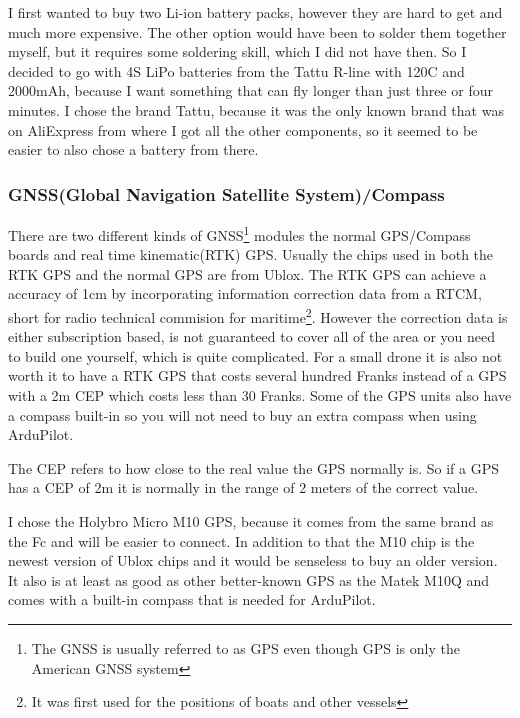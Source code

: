 \documentclass{article}
\begin{document}
	I first wanted to buy two Li-ion battery packs, however they are hard to get and much more expensive. The other option would have been to solder them together myself, but it requires some soldering skill, which I did not have then. So I decided to go with 4S LiPo batteries from the Tattu R-line with 120C and 2000mAh\cite{tattu}, because I want something that can fly longer than just three or four minutes. I chose the brand Tattu, because it was the only known brand that was on AliExpress from where I got all the other components, so it seemed to be easier to also chose a battery from there. 
	
	\subsubsection{GNSS(Global Navigation Satellite System)/Compass}
	There are two different kinds of GNSS\footnote{The GNSS is usually referred to as GPS even though GPS is only the American GNSS system} modules the normal GPS/Compass boards and real time kinematic(RTK) GPS. Usually the chips used in both the RTK GPS and the normal GPS are from Ublox. The RTK GPS can achieve a accuracy of 1cm by incorporating information correction data from a RTCM, short for radio technical commision for maritime\footnote{It was first used for the positions of boats and other vessels}. However the correction data is either subscription based, is not guaranteed to cover all of the area or you need to build one yourself, which is quite complicated\cite{rtkgps}. For a small drone it is also not worth it to have a RTK GPS that costs several hundred Franks instead of a GPS with a 2m \gls{CEP} which costs less than 30 Franks. Some of the GPS units also have a compass built-in so you will not need to buy an extra compass when using ArduPilot. 
	\begin{Explanation}
		The \gls{CEP} refers to how close to the real value the \gls{GPS} normally is. So if a \gls{GPS} has a \gls{CEP}
		of 2m it is normally in the range of 2 meters of the correct value. \cite{CEP}
	\end{Explanation}
	
	I chose the Holybro Micro M10 GPS\cite{holybrom10micro}, because it comes from the same brand as the Fc and will be easier to connect. In addition to that the M10 chip is the newest version of Ublox chips and it would be senseless to buy an older version. It also is at least as good as other better-known GPS as the Matek M10Q\cite{gpstest} and comes with a built-in compass that is needed for ArduPilot.
\end{document}
